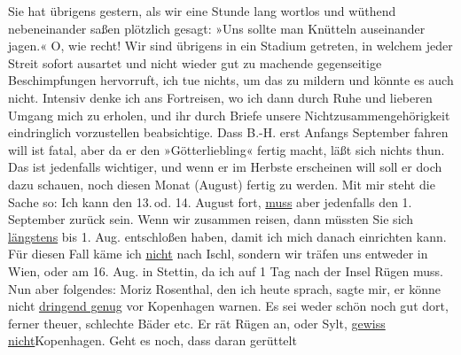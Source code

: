 \begin{ledgroupsized}[t]{13cm}
               Sie hat übrigens gestern, als wir eine Stunde lang wortlos und wüthend nebeneinander
               saßen plötzlich gesagt: »Uns sollte man Knütteln auseinander jagen.« O, wie recht!
               Wir sind übrigens in ein Stadium getreten, in welchem jeder Streit sofort ausartet
               und nicht wieder gut zu machende gegenseitige Beschimpfungen hervorruft, ich tue
               nichts, um das zu mildern {\pb}und könnte es auch nicht. Intensiv denke ich ans Fortreisen, wo ich dann durch Ruhe
               und lieberen Umgang mich zu erholen, und ihr durch Briefe unsere
               Nichtzusammengehörigkeit eindringlich vorzustellen beabsichtige. Dass B.-H. erst Anfangs September
               fahren will ist fatal, aber da er den »Götterliebling« fertig macht, läßt sich nichts thun. Das ist jedenfalls
               wichtiger, und wenn er im Herbste erscheinen will soll er doch dazu schauen, noch
               diesen Monat (August) fertig zu werden. Mit mir steht die Sache so: Ich kann den
                  13. od. 14. August fort, \uline{muss} aber
               jedenfalls den 1. September zurück sein. Wenn wir zusammen reisen, dann müssten Sie
               sich \uline{längstens} bis 1. Aug. entschloßen haben, damit
               ich mich danach einrichten kann. Für diesen Fall käme ich \uline{nicht} nach Ischl, sondern wir träfen uns
               entweder in Wien, oder am 16. Aug. in Stettin, da ich auf 1 Tag nach der Insel Rügen muss. \pend
           \pstart
           Nun aber folgendes: Moriz Rosenthal, den ich
               heute sprach, sagte mir, er könne nicht \uline{dringend
                  genug} vor Kopenhagen warnen. Es sei
               weder schön noch gut dort, ferner theuer, schlechte Bäder etc. Er rät Rügen an, oder Sylt, \uline{gewiss nicht}Kopenhagen. Geht es noch, dass daran gerüttelt

\end{ledgroupsized}
